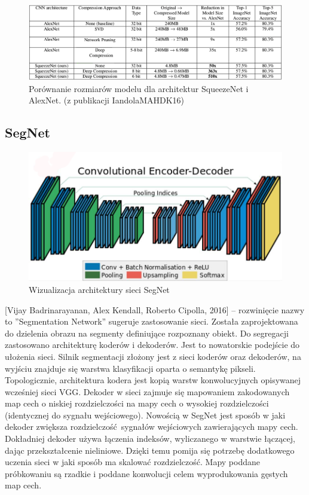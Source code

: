 \documentclass[12pt,a4paper,twoside,titlepage,openright]{book}
\begin{document}
\begin{figure}[ht]
	\centering
			\includegraphics[resolution=100, scale=0.55]{squeezeNetCompression.png}
		\caption{Porównanie rozmiarów modelu dla architektur SqueezeNet i AlexNet. (z publikacji IandolaMAHDK16)}
\end{figure}

\subsection{SegNet}
\begin{figure}[ht]
	\centering
			\includegraphics[resolution=100, scale=0.4]{SegNet.png}
		\caption{Wizualizacja architektury sieci SegNet}
\end{figure}
[Vijay Badrinarayanan, Alex Kendall, Roberto Cipolla, 2016] -- rozwinięcie nazwy to ''Segmentation Network'' sugeruje zastosowanie sieci. Została zaprojektowana do dzielenia obrazu na segmenty definiujące rozpoznany obiekt. Do segregacji zastosowano architekturę koderów i dekoderów. Jest to nowatorskie podejście do ułożenia sieci. Silnik segmentacji złożony jest z sieci koderów oraz dekoderów, na wyjściu znajduje się warstwa klasyfikacji oparta o semantykę pikseli. Topologicznie, architektura kodera jest kopią warstw konwolucyjnych opisywanej wcześniej sieci VGG. Dekoder w sieci zajmuje się mapowaniem zakodowanych map cech o niskiej rozdzielczości na mapy cech o wysokiej rozdzielczości (identycznej do sygnału wejściowego). Nowością w SegNet jest sposób w jaki dekoder zwiększa rozdzielczość sygnałów wejściowych zawierających mapy cech. Dokładniej dekoder używa łączenia indeksów, wyliczanego w warstwie łączącej, dając przekształcenie nieliniowe. Dzięki temu pomija się potrzebę dodatkowego uczenia sieci w jaki sposób ma skalować rozdzielczość. Mapy poddane próbkowaniu są rzadkie i poddane konwolucji celem wyprodukowania gęstych map cech.
\end{document}
